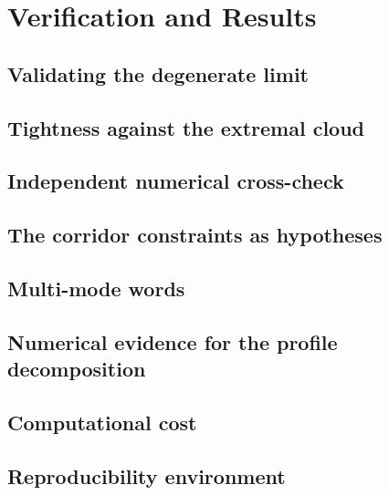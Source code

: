 
\section{Verification and Results}
\label{sec:verification}

\subsection{Validating the degenerate limit}
\label{sub:validating_the_degenerate_limit}

\subsection{Tightness against the extremal cloud}
\label{sub:tightness_against_extremal_cloud}

\subsection{Independent numerical cross-check}
\label{sub:independent_numerical_cross_check}

\subsection{The corridor constraints as hypotheses}
\label{sub:corridor_constraints_as_hypotheses}

\subsection{Multi-mode words}
\label{sub:multi_mode_words}

\subsection{Numerical evidence for the profile decomposition}
\label{sub:numerical_evidence_for_decomposition}

\subsection{Computational cost}
\label{sub:computational_cost}

\subsection{Reproducibility environment}
\label{sub:reproducibility_environment}

